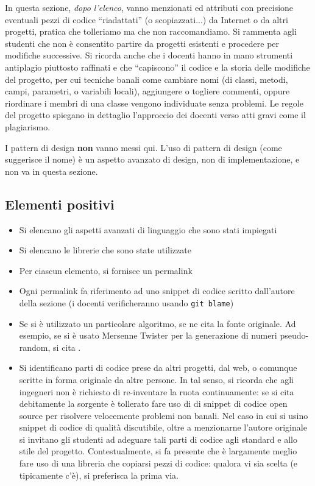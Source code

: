 \documentclass[a4paper,12pt]{report}
\begin{document}
In questa sezione, \textit{dopo l'elenco},
vanno menzionati ed attributi con precisione eventuali pezzi di codice ``riadattati'' (o scopiazzati...) da Internet o da altri progetti,
pratica che tolleriamo ma che non raccomandiamo.
%
Si rammenta agli studenti che non è consentito partire da progetti esistenti e procedere per modifiche successive.
%
Si ricorda anche che i docenti hanno in mano strumenti antiplagio piuttosto raffinati e che ``capiscono'' il codice e la storia delle modifiche del progetto,
per cui tecniche banali come cambiare nomi (di classi, metodi, campi, parametri, o variabili locali),
aggiungere o togliere commenti,
oppure riordinare i membri di una classe vengono individuate senza problemi.
%
Le regole del progetto spiegano in dettaglio l'approccio dei docenti verso atti gravi come il plagiarismo.

I pattern di design \textbf{non} vanno messi qui.
%
L'uso di pattern di design (come suggerisce il nome) è un aspetto avanzato di design, non di implementazione,
e non va in questa sezione.

\subsection*{Elementi positivi}

\begin{itemize}
	\item Si elencano gli aspetti avanzati di linguaggio che sono stati impiegati
	\item Si elencano le librerie che sono state utilizzate
	\item Per ciascun elemento, si fornisce un permalink
	\item Ogni permalink fa riferimento ad uno snippet di codice scritto dall'autore della sezione (i docenti verificheranno usando \texttt{git blame})
	\item Se si è utilizzato un particolare algoritmo, se ne cita la fonte originale.
	Ad esempio, se si è usato Mersenne Twister per la generazione di numeri pseudo-random, si cita \cite{mersenne}.
	\item Si identificano parti di codice prese da altri progetti, dal web, o comunque scritte in forma originale da altre persone.
	In tal senso, si ricorda che agli ingegneri non è richiesto di re-inventare la ruota continuamente:
	se si cita debitamente la sorgente è tollerato fare uso di di snippet di codice open source per risolvere velocemente problemi non banali.
	Nel caso in cui si usino snippet di codice di qualità discutibile,
	oltre a menzionarne l'autore originale si invitano gli studenti ad adeguare tali parti di codice agli standard e allo stile del progetto.
	Contestualmente, si fa presente che è largamente meglio fare uso di una libreria che copiarsi pezzi di codice:
	qualora vi sia scelta (e tipicamente c'è), si preferisca la prima via.
\end{itemize}
\end{document}

